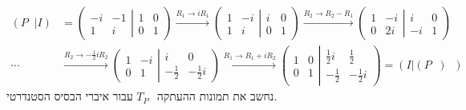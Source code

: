 \documentclass{article}
\DeclareMathOperator{\adj}{^\ast}
\DeclareMathOperator{\inv}{^{-1}}
\begin{document}
\begin{align*}
    ( P \adj | I ) & =
    \left(
    \begin{matrix}
            -i & -1 \\
            1  & i
        \end{matrix}
    \left|
    \begin{matrix}
            1 & 0 \\
            0 & 1
        \end{matrix}
    \right.
    \right)
    \xrightarrow[]{R_1\rightarrow iR_1}
    \left(
    \begin{matrix}
            1 & -i \\
            1 & i
        \end{matrix}
    \left|
    \begin{matrix}
            i & 0 \\
            0 & 1
        \end{matrix}
    \right.
    \right)
    \xrightarrow{R_2\rightarrow R_2-R_1}
    \left(
    \begin{matrix}
            1 & -i \\
            0 & 2i
        \end{matrix}
    \left|
    \begin{matrix}
            i  & 0 \\
            -i & 1
        \end{matrix}
    \right.
    \right)                                                        \\
    \cdots         & \xrightarrow{R_2\rightarrow -\frac 1 2 i R_2}
    \left(
    \begin{matrix}
            1 & -i \\
            0 & 1
        \end{matrix}
    \left|
    \begin{matrix}
            i          & 0            \\
            -\frac 1 2 & -\frac 1 2 i
        \end{matrix}
    \right.
    \right)
    \xrightarrow{R_1\rightarrow R_1+iR_2}
    \left(
    \begin{matrix}
            1 & 0 \\
            0 & 1
        \end{matrix}
    \left|
    \begin{matrix}
            \frac 1 2 i & \frac 1 2    \\
            -\frac 1 2  & -\frac 1 2 i
        \end{matrix}
    \right.
    \right) = ( I | (P \adj ) \inv)
\end{align*}
נחשב את תמונות ההעתקה $T_{P\adj}$ עבור איברי הבסיס הסטנדרטי.
\end{document}
